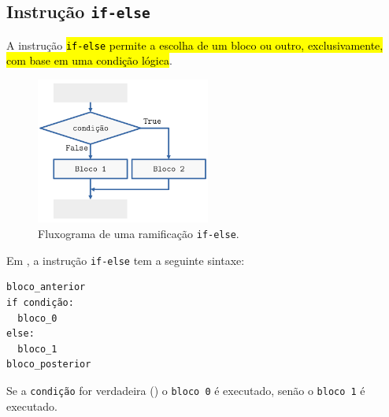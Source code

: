


\subsection{Instrução \texttt{if-else}}

A instrução \hl{\texttt{if-else} permite a escolha de um bloco ou outro, exclusivamente, com base em uma condição lógica}.

\begin{figure}[H]
  \centering
  \includegraphics[width=2.25in]{./cap_progest/dados/fig_fg_else/fig.png}
  \caption{Fluxograma de uma ramificação \lstinline+if-else+.}
  \label{cap_progest_sec_ramifica:fig:fg_else}
\end{figure}

Em {\python}, a instrução \lstinline+if-else+ tem a seguinte sintaxe:

\begin{lstlisting}
bloco_anterior
if condição:
  bloco_0
else:
  bloco_1
bloco_posterior
\end{lstlisting}

Se a {\lstinline+condição+} for verdadeira ({\PYTHONTrue}) o {\lstinline+bloco 0+} é executado, senão o {\lstinline+bloco 1+} é executado.

